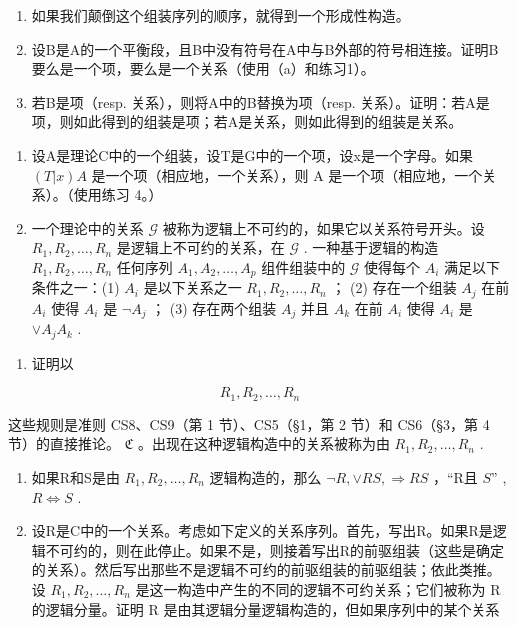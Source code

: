 \begin{enumerate}
\def\labelenumi{(\alph{enumi})}
\item
  如果我们颠倒这个组装序列的顺序，就得到一个形成性构造。
\item
  设B是A的一个平衡段，且B中没有符号在A中与B外部的符号相连接。证明B要么是一个项，要么是一个关系（使用（a）和练习1）。
\item
  若B是项（resp. 关系），则将A中的B替换为项（resp. 关系）。证明：若A是项，则如此得到的组装是项；若A是关系，则如此得到的组装是关系。
\end{enumerate}

\begin{enumerate}
\def\labelenumi{\arabic{enumi}.}
\setcounter{enumi}{4}
\item
  设A是理论C中的一个组装，设T是G中的一个项，设x是一个字母。如果 \((T|x)A\) 是一个项（相应地，一个关系），则 A 是一个项（相应地，一个关系）。（使用练习 4。）
\item
  一个理论中的关系 \(\mathcal{G}\) 被称为逻辑上不可约的，如果它以关系符号开头。设 \(R_{1}, R_{2}, \ldots, R_{n}\) 是逻辑上不可约的关系，在 \(\mathcal{G}\) . 一种基于逻辑的构造 \(R_{1}, R_{2}, \ldots, R_{n}\) 任何序列 \(A_{1}, A_{2}, \ldots, A_{p}\) 组件组装中的 \(\mathcal{G}\) 使得每个 \(A_{i}\) 满足以下条件之一：(1) \(A_{i}\) 是以下关系之一 \(R_{1}, R_{2}, \ldots, R_{n}\) ； (2) 存在一个组装 \(A_{j}\) 在前 \(A_{i}\) 使得 \(A_{i}\) 是 \(\neg A_{j}\) ； (3) 存在两个组装 \(A_{j}\) 并且 \(A_{k}\) 在前 \(A_{i}\) 使得 \(A_{i}\) 是 \(\vee A_{j}A_{k}\) .
\end{enumerate}

\begin{enumerate}
\def\labelenumi{(\alph{enumi})}
\tightlist
\item
  证明以
\end{enumerate}

\[
R _ {1}, R _ {2}, \dots , R _ {n}
\]

这些规则是准则 CS8、CS9（第 1 节）、CS5（§1，第 2 节）和 CS6（§3，第 4 节）的直接推论。 \(\mathfrak{C}\) 。出现在这种逻辑构造中的关系被称为由 \(R_{1}, R_{2}, \ldots, R_{n}\) .

\begin{enumerate}
\def\labelenumi{(\alph{enumi})}
\setcounter{enumi}{1}
\item
  如果R和S是由 \(R_{1}, R_{2}, \ldots, R_{n}\) 逻辑构造的，那么 \(\neg R, \vee RS, \Longrightarrow RS\) ，“R且 \(S\)'' , \(R \Longleftrightarrow S\) .
\item
  设R是C中的一个关系。考虑如下定义的关系序列。首先，写出R。如果R是逻辑不可约的，则在此停止。如果不是，则接着写出R的前驱组装（这些是确定的关系）。然后写出那些不是逻辑不可约的前驱组装的前驱组装；依此类推。设 \(R_{1}, R_{2}, \ldots, R_{n}\) 是这一构造中产生的不同的逻辑不可约关系；它们被称为 R 的逻辑分量。证明 R 是由其逻辑分量逻辑构造的，但如果序列中的某个关系
\end{enumerate}

